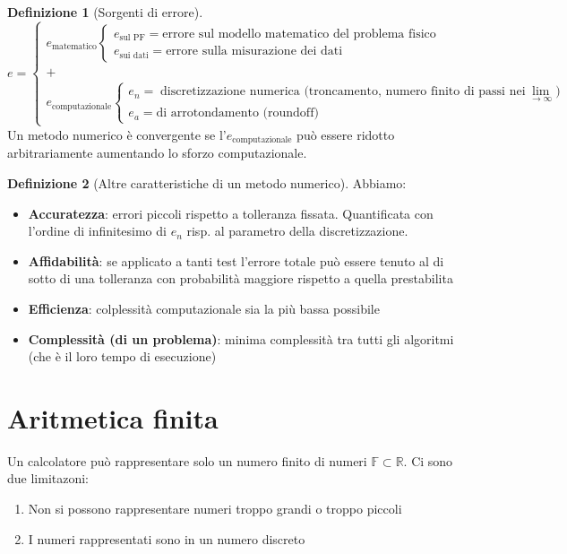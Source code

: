 \documentclass[a4paper,10pt]{article}
\theoremstyle{definition}
\newcommand{\re}{\mathbb{R}} %
\theoremstyle{indentdefinition}
\newtheorem{defn}{Definizione}[section]
\theoremstyle{indenttheorem}
\theoremstyle{myremark}
\theoremstyle{indentgeneral}
\theoremstyle{plain}
\theoremstyle{plain}
\begin{document}
\begin{defn}[Sorgenti di errore]
    $$e=\begin{cases}
        e_{\text{matematico}} \begin{cases}
              e_{\text{sul PF}}=\text{errore sul modello matematico del problema fisico}\\
                e_{\text{sui dati}}=\text{errore sulla misurazione dei dati}
        \end{cases}\\
        + \\
          e_{\text{computazionale}} \begin{cases}
                e_{n}=\text{discretizzazione numerica (troncamento, numero finito di passi nei $\lim_{\to\infty}$}) \\
                e_a=\text{di arrotondamento (roundoff)}
          \end{cases}
    \end{cases}$$
    Un metodo numerico è convergente se l'$ e_{\text{computazionale}}$ può essere ridotto arbitrariamente aumentando lo sforzo computazionale.
\end{defn}

\begin{defn}[Altre caratteristiche di un metodo numerico]
    Abbiamo:
    \begin{itemize}
        \item \textbf{Accuratezza}: errori piccoli rispetto a tolleranza fissata. Quantificata con l'ordine di infinitesimo di $e_n$ risp. al parametro della discretizzazione.
        \item  \textbf{Affidabilità}: se applicato a tanti test l'errore totale può essere tenuto al di sotto di una tolleranza con probabilità maggiore rispetto a quella prestabilita
        \item \textbf{Efficienza}: colplessità computazionale sia la più bassa possibile
        \item \textbf{Complessità (di un problema)}: minima complessità tra tutti gli algoritmi (che è il loro tempo di esecuzione) 
    \end{itemize}
\end{defn}

\section{Aritmetica finita}
Un calcolatore può rappresentare solo un numero finito di numeri $\mathbb{F}\subset\re$. Ci sono due limitazoni:
    \begin{enumerate}
        \item Non si possono rappresentare numeri troppo grandi o troppo piccoli
        \item I numeri rappresentati sono in un numero discreto
    \end{enumerate}
\end{document}
